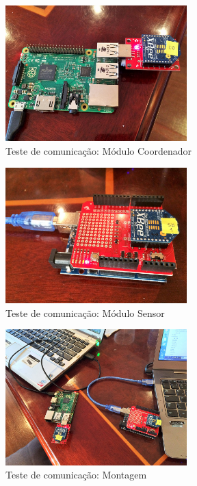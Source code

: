 \begin{figure}[H]
\centering
\includegraphics[width=7cm,keepaspectratio]{figuras/teste-inicial-raspberry.jpg}
\caption{\label{fig:teste-inicial-raspberry} Teste de comunicação: Módulo Coordenador}
\end{figure}

\begin{figure}[H]
\centering
\includegraphics[width=7cm,keepaspectratio]{figuras/teste-inicial-arduino.jpg} 
\caption{\label{fig:teste-inicial-arduino} Teste de comunicação: Módulo Sensor}
\end{figure}

\begin{figure}[H]
\centering
\includegraphics[width=7cm,keepaspectratio]{figuras/teste-inicial-all.jpg} 
\caption{\label{fig:teste-inicial-all} Teste de comunicação: Montagem}
\end{figure}



